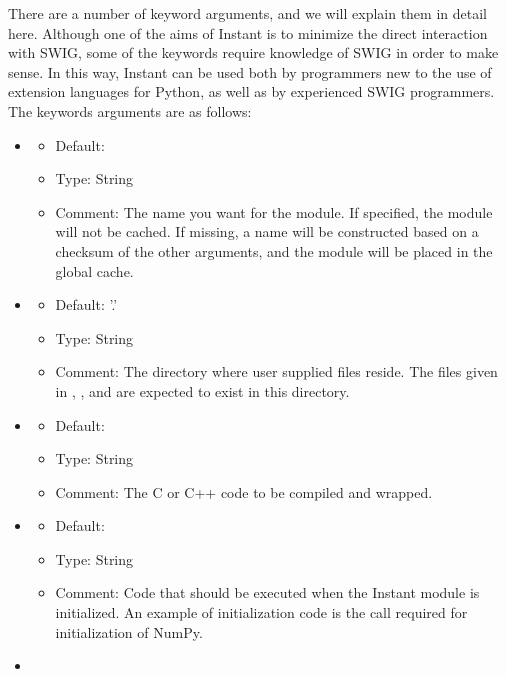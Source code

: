 There are a number of keyword arguments, and we will explain them in detail
here. Although one of the aims of Instant is to minimize the direct
interaction with SWIG, some of the keywords require knowledge of SWIG
in order to make sense. In this way, Instant can be used both by programmers
new to the use of extension languages for Python, as well as by experienced
SWIG programmers. The keywords arguments are as follows:
\begin{itemize}
\item {}
  \begin{itemize}
  \item Default: 
  \item Type: String
  \item Comment: The name you want for the module.
    If specified, the module will not be cached.
    If missing, a name will be constructed based on
    a checksum of the other arguments, and the module
    will be placed in the global cache.
  \end{itemize}
\item {}
  \begin{itemize}
    \item Default: '.'
    \item Type: String
    \item Comment: The directory where user supplied files reside. The files
      given in , , and 
      are expected to exist in this directory.
  \end{itemize}
\item {}
  \begin{itemize}
    \item Default: 
    \item Type: String
    \item Comment: The C or C++ code to be compiled and wrapped.
  \end{itemize}
\item {}
  \begin{itemize}
    \item Default: 
    \item Type: String
    \item Comment: Code that should be executed when the Instant module is
      initialized. An
      example of initialization code is the call  required for
      initialization of NumPy.
  \end{itemize}
\item {}

\end{itemize}

